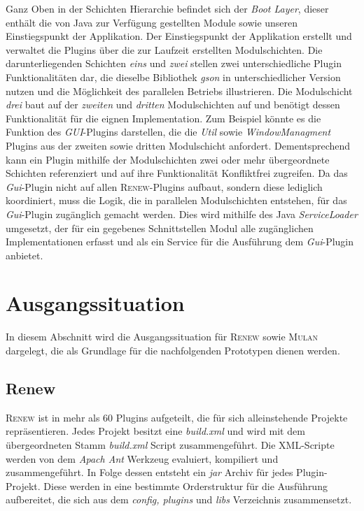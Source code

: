 			Ganz Oben in der Schichten Hierarchie befindet sich der \textit{Boot Layer}, dieser enthält die von Java zur Verfügung gestellten Module sowie unseren Einstiegspunkt der Applikation. Der Einstiegspunkt der Applikation erstellt und verwaltet die Plugins über die zur Laufzeit  erstellten Modulschichten. Die darunterliegenden Schichten \textit{eins} und \textit{zwei} stellen zwei unterschiedliche Plugin Funktionalitäten dar, die dieselbe Bibliothek \textit{gson} in unterschiedlicher Version nutzen und die Möglichkeit des parallelen Betriebs illustrieren. Die Modulschicht \textit{drei} baut auf der \textit{zweiten} und \textit{dritten} Modulschichten auf und benötigt dessen Funktionalität für die eignen Implementation. Zum Beispiel könnte es die Funktion des \textit{GUI}-Plugins darstellen, die die \textit{Util} sowie \textit{WindowManagment} Plugins aus der zweiten sowie dritten Modulschicht anfordert. Dementsprechend kann ein Plugin mithilfe der Modulschichten zwei oder mehr übergeordnete Schichten referenziert und auf ihre Funktionalität Konfliktfrei zugreifen.\newline
			Da das \textit{Gui}-Plugin nicht auf allen \textsc{Renew}-Plugins aufbaut, sondern diese lediglich koordiniert, muss die Logik, die in parallelen Modulschichten entstehen, für das \textit{Gui}-Plugin zugänglich gemacht werden. Dies wird mithilfe des Java \textit{ServiceLoader} umgesetzt, der für ein gegebenes Schnittstellen Modul alle zugänglichen Implementationen erfasst und als ein Service für die Ausführung dem \textit{Gui}-Plugin anbietet.\bigbreak

\section{Ausgangssituation} \label{sec:ausgangssituation} 
	In diesem Abschnitt wird die Ausgangssituation für \textsc{Renew} sowie \textsc{Mulan} dargelegt, die als Grundlage für die nachfolgenden Prototypen dienen werden. 

	\subsection{Renew} \label{sub:renew}
		\textsc{Renew} ist in mehr als 60 Plugins aufgeteilt, die für sich alleinstehende Projekte repräsentieren. Jedes Projekt besitzt eine \textit{build.xml} und wird mit dem übergeordneten Stamm \textit{build.xml} Script zusammengeführt. Die XML-Scripte werden von dem \textit{Apach Ant} Werkzeug evaluiert, kompiliert und zusammengeführt. In Folge dessen entsteht ein \textit{jar} Archiv für jedes Plugin-Projekt. Diese werden in eine bestimmte Orderstruktur für die Ausführung aufbereitet, die sich aus dem \textit{config, plugins} und \textit{libs} Verzeichnis zusammensetzt. \bigbreak

